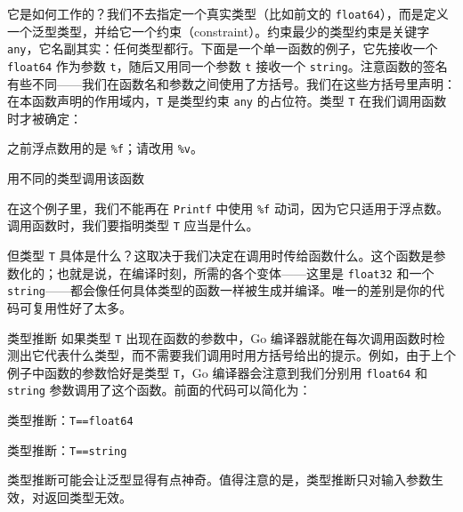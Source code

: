 它是如何工作的？我们不去指定一个真实类型（比如前文的 \texttt{float64}），而是定义一个泛型类型，并给它一个约束（constraint）。约束最少的类型约束是关键字 \texttt{any}，它名副其实：任何类型都行。下面是一个单一函数的例子，它先接收一个 \texttt{float64} 作为参数 \texttt{t}，随后又用同一个参数 \texttt{t} 接收一个 \texttt{string}。注意函数的签名有些不同——我们在函数名和参数之间使用了方括号。我们在这些方括号里声明：在本函数声明的作用域内，\texttt{T} 是类型约束 \texttt{any} 的占位符。类型 \texttt{T} 在我们调用函数时才被确定：


\begin{codeannotations}
\item 之前浮点数用的是 \texttt{\%f}；请改用 \texttt{\%v}。
\item 用不同的类型调用该函数
\end{codeannotations}

在这个例子里，我们不能再在 \texttt{Printf} 中使用 \texttt{\%f} 动词，因为它只适用于浮点数。调用函数时，我们要指明类型 \texttt{T} 应当是什么。

但类型 \texttt{T} 具体是什么？这取决于我们决定在调用时传给函数什么。这个函数是参数化的；也就是说，在编译时刻，所需的各个变体——这里是 \texttt{float32} 和一个 \texttt{string}——都会像任何具体类型的函数一样被生成并编译。唯一的差别是你的代码可复用性好了太多。

\begin{infobox}{类型推断}
如果类型 \texttt{T} 出现在函数的参数中，Go 编译器就能在每次调用函数时检测出它代表什么类型，而不需要我们调用时用方括号给出的提示。例如，由于上个例子中函数的参数恰好是类型 \texttt{T}，Go 编译器会注意到我们分别用 \texttt{float64} 和 \texttt{string} 参数调用了这个函数。前面的代码可以简化为：


\begin{codeannotations}
\item 类型推断：\texttt{T==float64}
\item 类型推断：\texttt{T==string}
\end{codeannotations}

类型推断可能会让泛型显得有点神奇。值得注意的是，类型推断只对输入参数生效，对返回类型无效。
\end{infobox}

